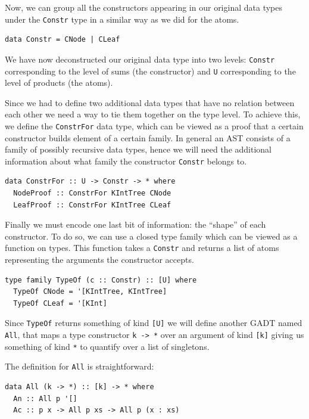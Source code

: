 \documentclass[11pt, titlepage]{article}
\newcommand{\toHaskell}[1]{\texttt{#1}\xspace}
\begin{document}
Now, we can group all the constructors appearing in our original
data types under the \texttt{Constr} type in a similar way as we
did for the atoms. 

\begin{verbatim}
data Constr = CNode | CLeaf
\end{verbatim}

We have now deconstructed our original data type into two levels: \texttt{Constr} corresponding to the level of sums (the constructor) 
and  \texttt{U} corresponding to the level of products (the atoms).

Since we had to define two additional data types that have no relation between 
each other we need a way to tie them together on the type level.
To achieve this, we define the \texttt{ConstrFor} data type,
which can be viewed as a proof that a certain constructor builds element
of a certain family. In general an AST consists of a family of possibly 
recursive data types, hence we will need the additional information about what 
family the constructor \texttt{Constr} belongs to.

\begin{verbatim}
data ConstrFor :: U -> Constr -> * where
  NodeProof :: ConstrFor KIntTree CNode
  LeafProof :: ConstrFor KIntTree CLeaf
\end{verbatim}

Finally we must encode one last bit of information: the ``shape'' of
each constructor. To do so, we can use a closed type family which can be
viewed as a function on types. This function takes a \texttt{Constr} and
returns a list of atoms representing the arguments the constructor
accepts.

\begin{verbatim}
type family TypeOf (c :: Constr) :: [U] where
  TypeOf CNode = '[KIntTree, KIntTree]
  TypeOf CLeaf = '[KInt]
\end{verbatim}

Since \toHaskell{TypeOf} returns something of kind \toHaskell{[U]} we will define another GADT named \toHaskell{All}, that maps a type constructor \toHaskell{k -> *} over an argument of kind \texttt{[k]} giving us something of kind \texttt{*} to quantify over a list of singletons.

The definition for \texttt{All} is straightforward:

\begin{verbatim}
data All (k -> *) :: [k] -> * where
  An :: All p '[]
  Ac :: p x -> All p xs -> All p (x : xs)
\end{verbatim}
\end{document}
